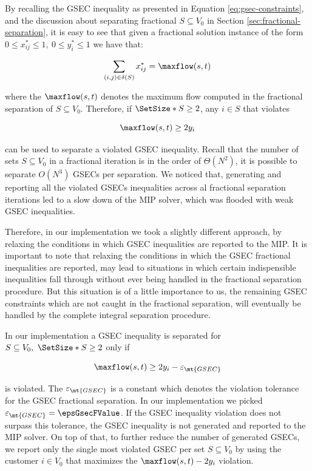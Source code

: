 By recalling the GSEC inequality as presented in Equation \eqref{eq:gsec-constraints}, and the discussion about separating fractional $S \subseteq V_0$ in Section \ref{sec:fractional-separation}, it is easy to see that given a fractional solution instance of the form $0 \le x^*_{ij} \le 1,\ 0 \le y^*_{i} \le 1$ we have that:

\begin{equation}
	\sum_{(i, j) \in \delta(S)} x^*_{ij} = \maxflow(s, t)
\end{equation}

where the $\maxflow(s, t)$ denotes the maximum flow computed in the fractional separation of $S \subseteq V_0$.
Therefore, if $\SetSize*{S} \ge 2$, any $i \in S$ that violates

\begin{equation}
	\maxflow(s, t) \ge 2 y_i
\end{equation}

can be used to separate a violated GSEC inequality.
Recall that the number of sets $S \subseteq V_0$ in a fractional iteration is in the order of $\Theta(N^2)$, it is possible to separate $O(N^3)$ GSECs per separation.
We noticed that, generating and reporting all the violated GSECs inequalities across al fractional separation iterations led to a slow down of the MIP solver, which was flooded with weak GSEC inequalities.

Therefore, in our implementation we took a slightly different approach, by relaxing the conditions in which GSEC inequalities are reported to the MIP.
It is important to note that relaxing the conditions in which the GSEC fractional inequalities are reported, may lead to situations in which certain indispensible inequalities fall through without ever being handled in the fractional separation procedure.
But this situation is of a little importance to us, the remaining GSEC constraints which are not caught in the fractional separation, will eventually be handled by the complete integral separation procedure.

In our implementation a GSEC inequality is separated for $S \subseteq V_0,\ \SetSize*{S} \ge 2$ only if

\begin{equation}
	\maxflow(s, t) \ge 2 y_i - \varepsilon_{\mt{GSEC}}
\end{equation}

is violated.
The $\varepsilon_{\mt{GSEC}}$ is a constant which denotes the violation tolerance for the GSEC fractional separation.
In our implementation we picked $\varepsilon_{\mt{GSEC}} = \epsGsecFValue$.
If the GSEC inequality violation does not surpass this tolerance, the GSEC inequality is not generated and reported to the MIP solver.
On top of that, to further reduce the number of generated GSECs, we report only the single most violated GSEC per set $S \subseteq V_0$ by using the customer $i \in V_0$ that maximizes the $\maxflow(s, t) - 2 y_i$ violation.

